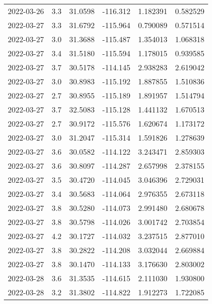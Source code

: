 \begin{tabular}{lrrrrr}
2022-03-26 &       3.3 &  31.0598 &  -116.312 &         1.182391 &         0.582529 \\
2022-03-27 &       3.3 &  31.6792 &  -115.964 &         0.790089 &         0.571514 \\
2022-03-27 &       3.0 &  31.3688 &  -115.487 &         1.354013 &         1.068318 \\
2022-03-27 &       3.4 &  31.5180 &  -115.594 &         1.178015 &         0.939585 \\
2022-03-27 &       3.7 &  30.5178 &  -114.145 &         2.938283 &         2.619042 \\
2022-03-27 &       3.0 &  30.8983 &  -115.192 &         1.887855 &         1.510836 \\
2022-03-27 &       2.7 &  30.8955 &  -115.189 &         1.891957 &         1.514794 \\
2022-03-27 &       3.7 &  32.5083 &  -115.128 &         1.441132 &         1.670513 \\
2022-03-27 &       2.7 &  30.9172 &  -115.576 &         1.620674 &         1.173172 \\
2022-03-27 &       3.0 &  31.2047 &  -115.314 &         1.591826 &         1.278639 \\
2022-03-27 &       3.6 &  30.0582 &  -114.122 &         3.243471 &         2.859303 \\
2022-03-27 &       3.6 &  30.8097 &  -114.287 &         2.657998 &         2.378155 \\
2022-03-27 &       3.5 &  30.4720 &  -114.045 &         3.046396 &         2.729031 \\
2022-03-27 &       3.4 &  30.5683 &  -114.064 &         2.976355 &         2.673118 \\
2022-03-27 &       3.8 &  30.5280 &  -114.073 &         2.991480 &         2.680678 \\
2022-03-27 &       3.8 &  30.5798 &  -114.026 &         3.001742 &         2.703854 \\
2022-03-27 &       4.2 &  30.1727 &  -114.032 &         3.237515 &         2.877010 \\
2022-03-27 &       3.8 &  30.2822 &  -114.208 &         3.032044 &         2.669884 \\
2022-03-27 &       3.8 &  30.1470 &  -114.133 &         3.176630 &         2.803002 \\
2022-03-28 &       3.6 &  31.3535 &  -114.615 &         2.111030 &         1.930800 \\
2022-03-28 &       3.2 &  31.3802 &  -114.822 &         1.912273 &         1.722085 \\

\end{tabular}
